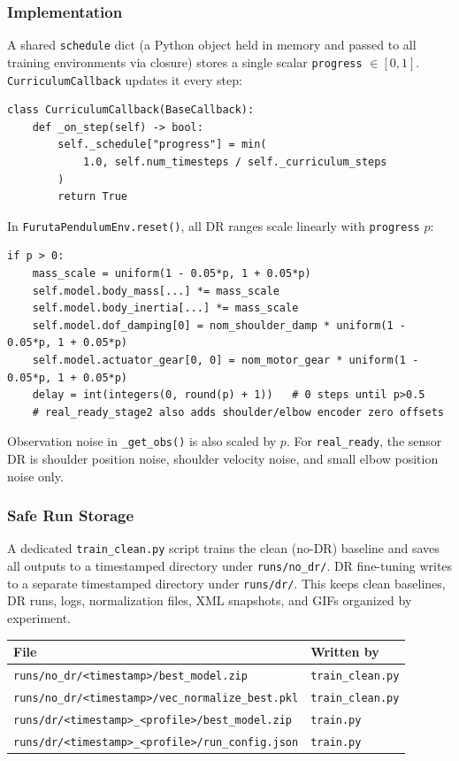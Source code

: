 \documentclass[12pt,a4paper]{article}
\begin{document}
\subsubsection{Implementation}

A shared \texttt{schedule} dict (a Python object held in memory and passed to
all training environments via closure) stores a single scalar \texttt{progress}
$\in [0, 1]$. \texttt{CurriculumCallback} updates it every step:

\begin{lstlisting}[style=python]
class CurriculumCallback(BaseCallback):
    def _on_step(self) -> bool:
        self._schedule["progress"] = min(
            1.0, self.num_timesteps / self._curriculum_steps
        )
        return True
\end{lstlisting}

\noindent In \texttt{FurutaPendulumEnv.reset()}, all DR ranges scale linearly
with \texttt{progress} $p$:

\begin{lstlisting}[style=python]
if p > 0:
    mass_scale = uniform(1 - 0.05*p, 1 + 0.05*p)
    self.model.body_mass[...] *= mass_scale
    self.model.body_inertia[...] *= mass_scale
    self.model.dof_damping[0] = nom_shoulder_damp * uniform(1 - 0.05*p, 1 + 0.05*p)
    self.model.actuator_gear[0, 0] = nom_motor_gear * uniform(1 - 0.05*p, 1 + 0.05*p)
    delay = int(integers(0, round(p) + 1))   # 0 steps until p>0.5
    # real_ready_stage2 also adds shoulder/elbow encoder zero offsets
\end{lstlisting}

\noindent Observation noise in \texttt{\_get\_obs()} is also scaled by $p$.
For \texttt{real\_ready}, the sensor DR is shoulder position noise, shoulder
velocity noise, and small elbow position noise only.

\subsubsection{Safe Run Storage}

A dedicated \texttt{train\_clean.py} script trains the clean (no-DR) baseline
and saves all outputs to a timestamped directory under
\texttt{runs/no\_dr/}.  DR fine-tuning writes to a separate timestamped
directory under \texttt{runs/dr/}.  This keeps clean baselines, DR runs, logs,
normalization files, XML snapshots, and GIFs organized by experiment.

\begin{center}
\begin{tabular}{ll}
\toprule
\textbf{File} & \textbf{Written by} \\
\midrule
\texttt{runs/no\_dr/<timestamp>/best\_model.zip} & \texttt{train\_clean.py} \\
\texttt{runs/no\_dr/<timestamp>/vec\_normalize\_best.pkl} & \texttt{train\_clean.py} \\
\texttt{runs/dr/<timestamp>\_<profile>/best\_model.zip} & \texttt{train.py} \\
\texttt{runs/dr/<timestamp>\_<profile>/run\_config.json} & \texttt{train.py} \\
\bottomrule
\end{tabular}
\end{center}
\end{document}
